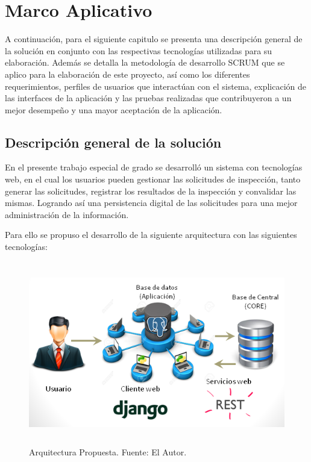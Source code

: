 \chapter{Marco Aplicativo}
\setlength{\parskip}{5mm}
A continuación, para el siguiente capitulo se presenta una descripción general de la solución en conjunto con las respectivas tecnologías utilizadas para su elaboración. Además se detalla la metodología de desarrollo SCRUM que se aplico para la elaboración de este proyecto, así como los diferentes requerimientos, perfiles de usuarios que interactúan con el sistema, explicación de las interfaces de la aplicación y las pruebas realizadas que contribuyeron a un mejor desempeño y una mayor aceptación de la aplicación. 

\setlength{\parskip}{0mm}

\section{Descripción general de la solución} 
\setlength{\parskip}{5mm}

En el presente trabajo especial de grado se desarrolló un sistema con tecnologías web, en el cual los usuarios pueden gestionar las solicitudes de inspección, tanto generar las solicitudes, registrar los resultados de la inspección y convalidar las mismas. Logrando así una persistencia digital de las solicitudes para una mejor administración de la información.

Para ello se propuso el desarrollo de la siguiente arquitectura con las siguientes tecnologías:

\newpage
\begin{figure}[H]
\begin{center}
	\includegraphics[width=15cm,height=8cm]{img/con_tecnologia1.png}
\end{center}
\caption{Arquitectura Propuesta. Fuente: El Autor.}
\label{fig:Con_Tec}
\end{figure}

